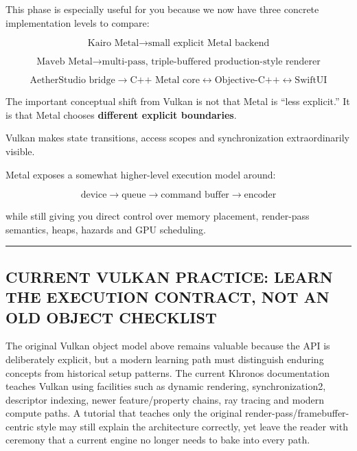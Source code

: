 This phase is especially useful for you because we now have three concrete implementation levels to compare:

\[
\boxed{
\text{Kairo Metal}
\rightarrow
\text{small explicit Metal backend}
}
\]

\[
\boxed{
\text{Maveb Metal}
\rightarrow
\text{multi-pass, triple-buffered production-style renderer}
}
\]

\[
\boxed{
\text{AetherStudio bridge}
\rightarrow
\text{C++ Metal core}\leftrightarrow\text{Objective-C++}\leftrightarrow\text{SwiftUI}
}
\]

The important conceptual shift from Vulkan is not that Metal is ``less explicit.'' It is that Metal chooses \textbf{different explicit boundaries}.

Vulkan makes state transitions, access scopes and synchronization extraordinarily visible.

Metal exposes a somewhat higher-level execution model around:

\[
\text{device}
\rightarrow
\text{queue}
\rightarrow
\text{command buffer}
\rightarrow
\text{encoder}
\]

while still giving you direct control over memory placement, render-pass semantics, heaps, hazards and GPU scheduling.

\begin{center}\rule{0.5\linewidth}{0.5pt}\end{center}

\subsection{CURRENT VULKAN PRACTICE: LEARN THE EXECUTION CONTRACT, NOT AN OLD OBJECT CHECKLIST}\label{05-engine-i-ch023-current-vulkan-practice-learn-the-execution-contract-not-an-old-object-checklist}

\hypertarget{05-engine-i-ch023-current-vulkan-practice-learn-the-execution-contract-not-an-old-object-checklist}{}

The original Vulkan object model above remains valuable because the API is deliberately explicit, but a modern learning path must distinguish enduring concepts from historical setup patterns. The current Khronos documentation teaches Vulkan using facilities such as dynamic rendering, synchronization2, descriptor indexing, newer feature/property chains, ray tracing and modern compute paths. A tutorial that teaches only the original render-pass/framebuffer-centric style may still explain the architecture correctly, yet leave the reader with ceremony that a current engine no longer needs to bake into every path.

